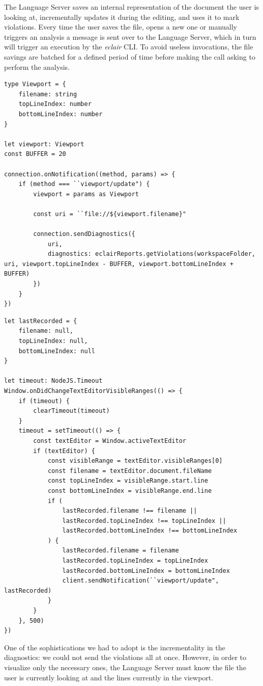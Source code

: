 The Language Server saves an internal representation of the document the user is looking at, incrementally updates it during the editing, and uses it to mark violations.
Every time the user saves the file, opens a new one or manually triggers an analysis a message is sent over to the Language Server, which in turn will trigger an execution by the \emph{eclair} CLI. To avoid useless invocations, the file savings are batched for a defined period of time before making the call asking to perform the analysis.
\begin{lstlisting}[caption={Server side code for viewport synchronization}, label={lst:block_struct}]
type Viewport = {
	filename: string
	topLineIndex: number
	bottomLineIndex: number
}

let viewport: Viewport
const BUFFER = 20

connection.onNotification((method, params) => {
	if (method === ``viewport/update") {
		viewport = params as Viewport

		const uri = ``file://${viewport.filename}"

		connection.sendDiagnostics({
			uri,
			diagnostics: eclairReports.getViolations(workspaceFolder, uri, viewport.topLineIndex - BUFFER, viewport.bottomLineIndex + BUFFER)
		})
	}
})
\end{lstlisting}

\begin{lstlisting}[caption={VSCode extension side code for viewport synchronization}, label={lst:block_struct}]
let lastRecorded = {
	filename: null,
	topLineIndex: null,
	bottomLineIndex: null
}

let timeout: NodeJS.Timeout
Window.onDidChangeTextEditorVisibleRanges(() => {
	if (timeout) {
		clearTimeout(timeout)
	}
	timeout = setTimeout(() => {
		const textEditor = Window.activeTextEditor
		if (textEditor) {
			const visibleRange = textEditor.visibleRanges[0]
			const filename = textEditor.document.fileName
			const topLineIndex = visibleRange.start.line
			const bottomLineIndex = visibleRange.end.line
			if (
				lastRecorded.filename !== filename ||
				lastRecorded.topLineIndex !== topLineIndex ||
				lastRecorded.bottomLineIndex !== bottomLineIndex
			) {
				lastRecorded.filename = filename
				lastRecorded.topLineIndex = topLineIndex
				lastRecorded.bottomLineIndex = bottomLineIndex
				client.sendNotification(``viewport/update", lastRecorded)
			}
		}
	}, 500)
})
\end{lstlisting}
One of the sophistications we had to adopt is the incrementality in the diagnostics: we could not send the violations all at once. However, in order to visualize only the necessary ones, the Language Server must know the file the user is currently looking at and the lines currently in the viewport. 

